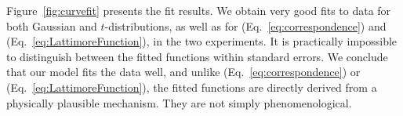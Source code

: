 \documentclass[a4paper, 12pt]{article}
\newcommand{\person}[1]{\textsc{#1}\xspace}
\newcommand{\eref}[1]{(Eq.~\ref{eq:#1})}
\newcommand{\flabel}[1]{\label{fig:#1}}
\newcommand{\Fref}[1]{Figure~\ref{fig:#1}}
\begin{document}
\Fref{curvefit} presents the fit results. We obtain very good fits to data for both Gaussian and $t$-distributions, as well as for \eref{correspondence} and \eref{LattimoreFunction}, in the two experiments. It is practically impossible to distinguish between the fitted functions within standard errors. We conclude that our model fits the data well, and unlike \eref{correspondence} or \eref{LattimoreFunction}, the fitted functions are directly derived from a physically plausible mechanism. They are not simply phenomenological.

\end{document}
